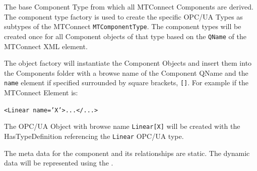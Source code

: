 \FloatBarrier


The base Component Type from which all MTConnect Components are derived. The 
component type factory is used to create the specific OPC/UA Types as subtypes of the 
MTConnect \texttt{MTComponentType}. The component types will be created once for all Component objects 
of that type based on the \texttt{QName} of the MTConnect XML element. 

The object factory will instantiate the Component Objects and insert them into the Components 
folder with a browse name of the Component QName and the \texttt{name} element if specified surrounded 
by square brackets, \texttt{[]}. For example if the MTConnect Element is:

\texttt{<Linear name='X'>...</...>}

The OPC/UA Object with browse name \texttt{Linear[X]} will be created with the HasTypeDefinition 
referencing the \texttt{Linear} OPC/UA type. 

The meta data for the component and its relationships are static. The dynamic data will be 
represented using the \cite{UAPart8}.



